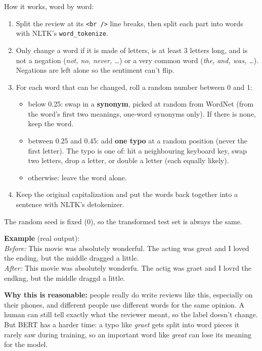 \documentclass[11pt]{article}
\newcommand{\code}[1]{\texttt{#1}}
\begin{document}
How it works, word by word:
\begin{enumerate}
  \item Split the review at its \code{<br />} line breaks, then split each part into words with
        NLTK's \code{word\_tokenize}.
  \item Only change a word if it is made of letters, is at least 3 letters long, and is not a
        negation (\emph{not, no, never, \dots}) or a very common word (\emph{the, and, was, \dots}).
        Negations are left alone so the sentiment can't flip.
  \item For each word that can be changed, roll a random number between 0 and 1:
  \begin{itemize}
    \item below 0.25: swap in a \textbf{synonym}, picked at random from WordNet (from the word's
          first two meanings, one-word synonyms only). If there is none, keep the word.
    \item between 0.25 and 0.45: add \textbf{one typo} at a random position (never the first
          letter). The typo is one of: hit a neighbouring keyboard key, swap two letters, drop a
          letter, or double a letter (each equally likely).
    \item otherwise: leave the word alone.
  \end{itemize}
  \item Keep the original capitalization and put the words back together into a sentence with
        NLTK's detokenizer.
\end{enumerate}
The random seed is fixed (0), so the transformed test set is always the same.

\textbf{Example} (real output):\\
\emph{Before:} This movie was absolutely wonderful. The acting was great and I loved the ending,
but the middle dragged a little.\\
\emph{After:} This movie was absolutely wonderfu. The actig was graet and I lovrd the endkng, but
the middle draggd a little.

\textbf{Why this is reasonable:} people really do write reviews like this, especially on their
phones, and different people use different words for the same opinion. A human can still tell
exactly what the reviewer meant, so the label doesn't change. But BERT has a harder time: a typo
like \emph{graet} gets split into word pieces it rarely saw during training, so an important word
like \emph{great} can lose its meaning for the model.
\end{document}
